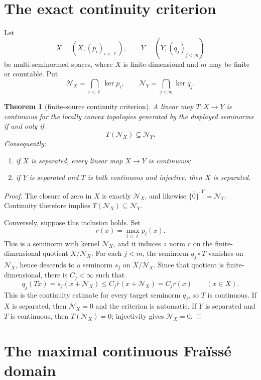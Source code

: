 \documentclass[10pt]{article}
\newtheorem{theorem}{Theorem}
\newcommand{\N}{\mathcal N}
\begin{document}
\section*{The exact continuity criterion}

Let
\[
 X=(X,(p_i)_{i<\ell}),\qquad Y=(Y,(q_j)_{j<m})
\]
be multi-seminormed spaces, where $X$ is finite-dimensional and $m$ may be
finite or countable.  Put
\[
 \N_X=\bigcap_{i<\ell}\ker p_i,
 \qquad
 \N_Y=\bigcap_{j<m}\ker q_j.
\]

\begin{theorem}[finite-source continuity criterion]\label{thm:criterion}
A linear map $T:X\to Y$ is continuous for the locally convex topologies
generated by the displayed seminorms if and only if
\[
                         T(\N_X)\subseteq \N_Y.
\]
Consequently:
\begin{enumerate}
\item if $X$ is separated, every linear map $X\to Y$ is continuous;
\item if $Y$ is separated and $T$ is both continuous and injective, then $X$
is separated.
\end{enumerate}
\end{theorem}

\begin{proof}
The closure of zero in $X$ is exactly $\N_X$, and likewise
$\overline{\{0\}}^{,Y}=\N_Y$.  Continuity therefore implies
$T(\N_X)\subseteq\N_Y$.

Conversely, suppose this inclusion holds.  Set
\[
             r(x)=\max_{i<\ell}p_i(x).
\]
This is a seminorm with kernel $\N_X$, and it induces a norm $\bar r$ on the
finite-dimensional quotient $X/\N_X$.  For each $j<m$, the seminorm
$q_j\circ T$ vanishes on $\N_X$, hence descends to a seminorm $s_j$ on
$X/\N_X$.  Since that quotient is finite-dimensional, there is $C_j<\infty$
such that
\[
              q_j(Tx)=s_j(x+\N_X)\le C_j\bar r(x+\N_X)=C_j r(x)
              \qquad(x\in X).
\]
This is the continuity estimate for every target seminorm $q_j$, so $T$ is
continuous.  If $X$ is separated, then $\N_X=0$ and the criterion is automatic.
If $Y$ is separated and $T$ is continuous, then $T(\N_X)=0$; injectivity gives
$\N_X=0$.
\end{proof}

\section*{The maximal continuous Fra\"iss\'e domain}
\end{document}
